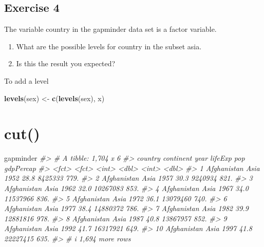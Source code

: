 \documentclass[
]{book}
\newenvironment{Shaded}{\begin{snugshade}}{\end{snugshade}}
\newcommand{\CommentTok}[1]{\textcolor[rgb]{0.56,0.35,0.01}{\textit{#1}}}
\newcommand{\FunctionTok}[1]{\textcolor[rgb]{0.13,0.29,0.53}{\textbf{#1}}}
\newcommand{\NormalTok}[1]{#1}
\newcommand{\OtherTok}[1]{\textcolor[rgb]{0.56,0.35,0.01}{#1}}
\newcommand{\StringTok}[1]{\textcolor[rgb]{0.31,0.60,0.02}{#1}}
\providecommand{\tightlist}{%
  \setlength{\itemsep}{0pt}\setlength{\parskip}{0pt}}
\begin{document}
\subsection*{Exercise 4}\label{exercise-4-2}

The variable country in the gapminder data set is a factor variable.

\begin{enumerate}
\def\labelenumi{\arabic{enumi}.}
\tightlist
\item
  What are the possible levels for country in the subset asia.
\item
  Is this the result you expected?
\end{enumerate}

To add a level

\begin{Shaded}
\begin{Highlighting}[]
\FunctionTok{levels}\NormalTok{(sex) }\OtherTok{\textless{}{-}} \FunctionTok{c}\NormalTok{(}\FunctionTok{levels}\NormalTok{(sex), }\StringTok{\textquotesingle{}x\textquotesingle{}}\NormalTok{)}
\end{Highlighting}
\end{Shaded}

\section*{cut()}\label{cut}

\begin{Shaded}
\begin{Highlighting}[]
\NormalTok{gapminder}
\CommentTok{\#\textgreater{} \# A tibble: 1,704 x 6}
\CommentTok{\#\textgreater{}    country     continent  year lifeExp      pop gdpPercap}
\CommentTok{\#\textgreater{}    \textless{}fct\textgreater{}       \textless{}fct\textgreater{}     \textless{}int\textgreater{}   \textless{}dbl\textgreater{}    \textless{}int\textgreater{}     \textless{}dbl\textgreater{}}
\CommentTok{\#\textgreater{}  1 Afghanistan Asia       1952    28.8  8425333      779.}
\CommentTok{\#\textgreater{}  2 Afghanistan Asia       1957    30.3  9240934      821.}
\CommentTok{\#\textgreater{}  3 Afghanistan Asia       1962    32.0 10267083      853.}
\CommentTok{\#\textgreater{}  4 Afghanistan Asia       1967    34.0 11537966      836.}
\CommentTok{\#\textgreater{}  5 Afghanistan Asia       1972    36.1 13079460      740.}
\CommentTok{\#\textgreater{}  6 Afghanistan Asia       1977    38.4 14880372      786.}
\CommentTok{\#\textgreater{}  7 Afghanistan Asia       1982    39.9 12881816      978.}
\CommentTok{\#\textgreater{}  8 Afghanistan Asia       1987    40.8 13867957      852.}
\CommentTok{\#\textgreater{}  9 Afghanistan Asia       1992    41.7 16317921      649.}
\CommentTok{\#\textgreater{} 10 Afghanistan Asia       1997    41.8 22227415      635.}
\CommentTok{\#\textgreater{} \# i 1,694 more rows}
\end{Highlighting}
\end{Shaded}
\end{document}
